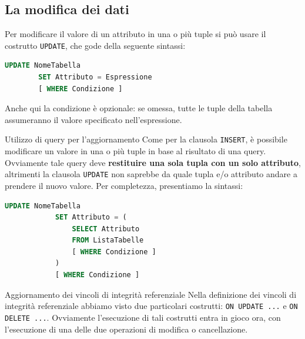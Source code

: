 \documentclass[12pt]{report}
\begin{document}
	\subsection{La modifica dei dati}
	Per modificare il valore di un attributo in una o più tuple si può usare il costrutto \texttt{UPDATE}, che gode della seguente sintassi:
	\begin{lstlisting}[language=SQL]
		UPDATE NomeTabella
		SET Attributo = Espressione
		[ WHERE Condizione ]
	\end{lstlisting}
	
	Anche qui la condizione è opzionale: se omessa, tutte le tuple della tabella assumeranno il valore specificato nell'espressione.
	\begin{osservazione}{Utilizzo di query per l'aggiornamento}{}
		Come per la clausola \texttt{INSERT}, è possibile modificare un valore in una o più tuple in base al risultato di una query. Ovviamente tale query deve \textbf{restituire una sola tupla con un solo attributo}, altrimenti la clausola \texttt{UPDATE} non saprebbe da quale tupla e/o attributo andare a prendere il nuovo valore. Per completezza, presentiamo la sintassi:
		\begin{lstlisting}[language=SQL]
			UPDATE NomeTabella
			SET Attributo = (
				SELECT Attributo
				FROM ListaTabelle
				[ WHERE Condizione ]
			)
			[ WHERE Condizione ]
		\end{lstlisting}
	\end{osservazione}
	
	\begin{osservazione}{Aggiornamento dei vincoli di integrità referenziale}{}
		Nella definizione dei vincoli di integrità referenziale abbiamo visto due particolari costrutti: \texttt{ON UPDATE ...} e \texttt{ON DELETE ...}. Ovviamente l'esecuzione di tali costrutti entra in gioco ora, con l'esecuzione di una delle due operazioni di modifica o cancellazione.
	\end{osservazione}
	
\end{document}
